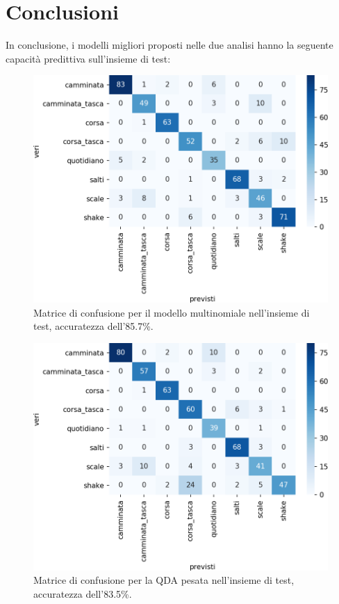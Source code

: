\documentclass[main.tex]{subfiles}
\begin{document}
\section{Conclusioni}
In conclusione, i modelli migliori proposti nelle due analisi hanno la seguente capacità predittiva sull'insieme di test:\\
\begin{minipage}{0.45\textwidth}
\begin{figure}[H]
	\centering
	\includegraphics[width=\confusion]{../../figure/confusionMatrix-Mn-test.png}
	\caption{Matrice di confusione per il modello multinomiale nell'insieme di test, accuratezza dell'85.7\%.}
	\label{fig:mn-test}
\end{figure}
\end{minipage}
\hfill
\begin{minipage}{0.45\textwidth}
\begin{figure}[H]
	\centering
	\includegraphics[width=\confusion]{../../figure/confusionMatrix-QDA-penalizzata-test.png}
	\caption{Matrice di confusione per la QDA pesata nell'insieme di test, accuratezza dell'83.5\%.}
	\label{fig:qda-test}
\end{figure}
\end{minipage}
\end{document}
